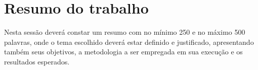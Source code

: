 \section{Resumo do trabalho}

Nesta sessão deverá constar um resumo com no mínimo 250 e no máximo 500 palavras, onde o tema escolhido deverá estar definido e justificado, apresentando também seus objetivos, a metodologia a ser empregada em sua execução e os resultados esperados.